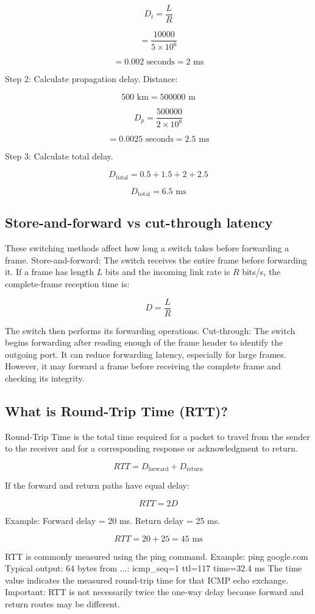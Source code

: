\[
D_t=\frac{L}{R}
\]


\[
=\frac{10000}{5\times10^6}
\]


\[
=0.002\text{ seconds}=2\text{ ms}
\]

Step 2: Calculate propagation delay.
Distance:

\[
500\text{ km}=500000\text{ m}
\]


\[
D_p=\frac{500000}{2\times10^8}
\]


\[
=0.0025\text{ seconds}=2.5\text{ ms}
\]

Step 3: Calculate total delay.

\[
D_{\text{total}}=0.5+1.5+2+2.5
\]


\[
\boxed{D_{\text{total}}=6.5\text{ ms}}
\]

\subsection{Store-and-forward vs cut-through latency}
These switching methods affect how long a switch takes before forwarding a frame.
Store-and-forward:
The switch receives the entire frame before forwarding it.
If a frame has length $L$ bits and the incoming link rate is $R$ bits/s, the complete-frame reception time is:

\[
D=\frac{L}{R}
\]

The switch then performs its forwarding operations.
Cut-through:
The switch begins forwarding after reading enough of the frame header to identify the outgoing port.
It can reduce forwarding latency, especially for large frames.
However, it may forward a frame before receiving the complete frame and checking its integrity.
\subsection{What is Round-Trip Time (RTT)?}
Round-Trip Time is the total time required for a packet to travel from the sender to the receiver and for a corresponding response or acknowledgment to return.

\[
\boxed{RTT=D_{\text{forward}}+D_{\text{return}}}
\]

If the forward and return paths have equal delay:

\[
RTT=2D
\]

Example:
Forward delay = 20 ms.
Return delay = 25 ms.

\[
RTT=20+25=\boxed{45\text{ ms}}
\]

RTT is commonly measured using the ping command.
Example:
ping google.com
Typical output:
64 bytes from ...: icmp\_seq=1 ttl=117 time=32.4 ms
The time value indicates the measured round-trip time for that ICMP echo exchange.
Important: RTT is not necessarily twice the one-way delay because forward and return routes may be different.

